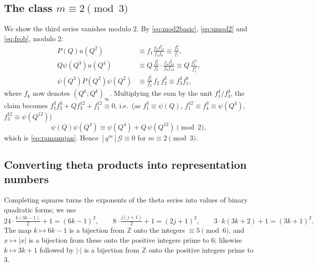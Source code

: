 \documentclass[11pt]{amsart}
\theoremstyle{definition}
\theoremstyle{remark}
\numberwithin{equation}{section}
\newcommand{\Z}{\mathbb{Z}}
\begin{document}
\subsection{The class \texorpdfstring{$m\equiv2\pmod 3$}{m = 2 mod 3}}
We show the third series vanishes modulo $2$. By \eqref{eq:mod2basic}, \eqref{eq:umod2} and \eqref{eq:frob}, modulo $2$:
\begin{align*}
P(Q)u(Q^2)&\equiv f_1\frac{f_2f_{12}^2}{f_4f_6}\equiv\frac{f_3^6}{f_1},\\
Q\psi(Q^3)u(Q^4)&\equiv Q\,\frac{f_6^2}{f_3}\cdot\frac{f_4f_{24}^2}{f_8f_{12}}\equiv Q\,\frac{f_3^{15}}{f_1^4},\\
\psi(Q^3)P(Q^2)\psi(Q^2)&\equiv\frac{f_6^2}{f_3}\,f_2\,f_2^3\equiv f_3^3f_1^8,
\end{align*}
where $f_k$ now denotes $(Q^k;Q^k)_\infty$. Multiplying the sum by the unit $f_1^4/f_3^3$, the claim becomes $f_1^3f_3^3+Qf_3^{12}+f_1^{12}\equiv0$, i.e.\ (as $f_1^3\equiv\psi(Q)$, $f_1^{12}\equiv f_4^3\equiv\psi(Q^4)$, $f_3^{12}\equiv\psi(Q^{12})$)
\[
\psi(Q)\psi(Q^3)\equiv\psi(Q^4)+Q\,\psi(Q^{12})\pmod 2,
\]
which is \eqref{eq:ramanujan}. Hence $[q^m]\mathcal G\equiv0$ for $m\equiv2\pmod3$.

\subsection{Converting theta products into representation numbers}
Completing squares turns the exponents of the theta series into values of binary quadratic forms; we use
\[
24\cdot\tfrac{k(3k-1)}{2}+1=(6k-1)^2,\qquad 8\cdot\tfrac{j(j+1)}{2}+1=(2j+1)^2,\qquad 3\cdot k(3k+2)+1=(3k+1)^2 .
\]
The map $k\mapsto 6k-1$ is a bijection from $\Z$ onto the integers $\equiv5\pmod 6$, and $x\mapsto|x|$ is a bijection from these onto the positive integers prime to $6$; likewise $k\mapsto 3k+1$ followed by $|\cdot|$ is a bijection from $\Z$ onto the positive integers prime to $3$.
\end{document}
